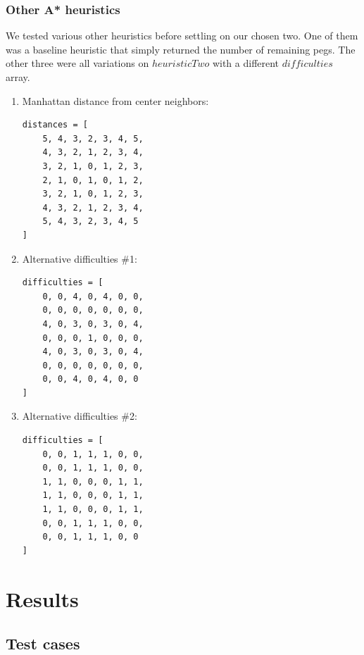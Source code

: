\documentclass[11pt]{article}
\begin{document}
\subsubsection{Other A* heuristics}

We tested various other heuristics before settling on our chosen two. One of
them was a baseline heuristic that simply returned the number of remaining
pegs. The other three were all variations on \(heuristicTwo\) with a different
\(difficulties\) array.

\begin{enumerate}

\item Manhattan distance from center neighbors:

\begin{lstlisting}[frame=single]
distances = [
	5, 4, 3, 2, 3, 4, 5,
	4, 3, 2, 1, 2, 3, 4,
	3, 2, 1, 0, 1, 2, 3,
	2, 1, 0, 1, 0, 1, 2,
	3, 2, 1, 0, 1, 2, 3,
	4, 3, 2, 1, 2, 3, 4,
	5, 4, 3, 2, 3, 4, 5
]
\end{lstlisting}

\item Alternative difficulties \#1:

\lstset{language=Python}
\begin{lstlisting}[frame=single]
difficulties = [
	0, 0, 4, 0, 4, 0, 0,
	0, 0, 0, 0, 0, 0, 0,
	4, 0, 3, 0, 3, 0, 4,
	0, 0, 0, 1, 0, 0, 0,
	4, 0, 3, 0, 3, 0, 4,
	0, 0, 0, 0, 0, 0, 0,
	0, 0, 4, 0, 4, 0, 0
]
\end{lstlisting}

\item Alternative difficulties \#2:

\lstset{language=Python}
\begin{lstlisting}[frame=single]
difficulties = [
	0, 0, 1, 1, 1, 0, 0,
	0, 0, 1, 1, 1, 0, 0,
	1, 1, 0, 0, 0, 1, 1,
	1, 1, 0, 0, 0, 1, 1,
	1, 1, 0, 0, 0, 1, 1,
	0, 0, 1, 1, 1, 0, 0,
	0, 0, 1, 1, 1, 0, 0
]
\end{lstlisting}

\end{enumerate}

\section{Results}

\subsection{Test cases}
\end{document}
